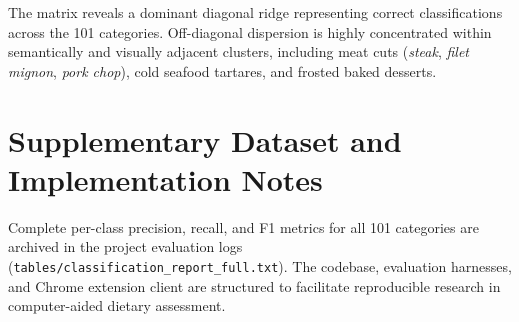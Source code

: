 \documentclass[conference]{IEEEtran}
\begin{document}
The matrix reveals a dominant diagonal ridge representing correct classifications across the 101 categories. Off-diagonal dispersion is highly concentrated within semantically and visually adjacent clusters, including meat cuts (\textit{steak}, \textit{filet mignon}, \textit{pork chop}), cold seafood tartares, and frosted baked desserts.

\section{Supplementary Dataset and Implementation Notes}
Complete per-class precision, recall, and F1 metrics for all 101 categories are archived in the project evaluation logs (\texttt{tables/classification\_report\_full.txt}). The codebase, evaluation harnesses, and Chrome extension client are structured to facilitate reproducible research in computer-aided dietary assessment.
\end{document}
